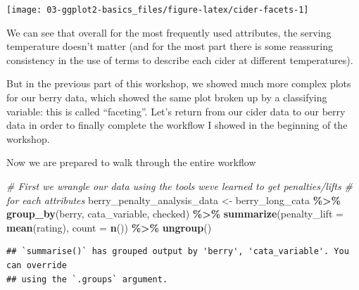 \documentclass[
]{book}
\newenvironment{Shaded}{\begin{snugshade}}{\end{snugshade}}
\newcommand{\AttributeTok}[1]{\textcolor[rgb]{0.13,0.29,0.53}{#1}}
\newcommand{\CommentTok}[1]{\textcolor[rgb]{0.56,0.35,0.01}{\textit{#1}}}
\newcommand{\FunctionTok}[1]{\textcolor[rgb]{0.13,0.29,0.53}{\textbf{#1}}}
\newcommand{\NormalTok}[1]{#1}
\newcommand{\OtherTok}[1]{\textcolor[rgb]{0.56,0.35,0.01}{#1}}
\newcommand{\SpecialCharTok}[1]{\textcolor[rgb]{0.81,0.36,0.00}{\textbf{#1}}}
\begin{document}
\begin{center}\texttt{[image: 03-ggplot2-basics\_files/figure-latex/cider-facets-1]} \end{center}

We can see that overall for the most frequently used attributes, the serving temperature doesn't matter (and for the most part there is some reassuring consistency in the use of terms to describe each cider at different temperatures).

But in the previous part of this workshop, we showed much more complex plots for our berry data, which showed the same plot broken up by a classifying variable: this is called ``faceting''. Let's return from our cider data to our berry data in order to finally complete the workflow I showed in the beginning of the workshop.

Now we are prepared to walk through the entire workflow

\begin{Shaded}
\begin{Highlighting}[]
\CommentTok{\# First we wrangle our data using the tools we\textquotesingle{}ve learned to get penalties/lifts}
\CommentTok{\# for each attributes}
\NormalTok{berry\_penalty\_analysis\_data }\OtherTok{\textless{}{-}} 
\NormalTok{  berry\_long\_cata }\SpecialCharTok{\%\textgreater{}\%}
  \FunctionTok{group\_by}\NormalTok{(berry, cata\_variable, checked) }\SpecialCharTok{\%\textgreater{}\%}
  \FunctionTok{summarize}\NormalTok{(}\AttributeTok{penalty\_lift =} \FunctionTok{mean}\NormalTok{(rating),}
            \AttributeTok{count =} \FunctionTok{n}\NormalTok{()) }\SpecialCharTok{\%\textgreater{}\%}
  \FunctionTok{ungroup}\NormalTok{() }
\end{Highlighting}
\end{Shaded}

\begin{verbatim}
## `summarise()` has grouped output by 'berry', 'cata_variable'. You can override
## using the `.groups` argument.
\end{verbatim}
\end{document}
